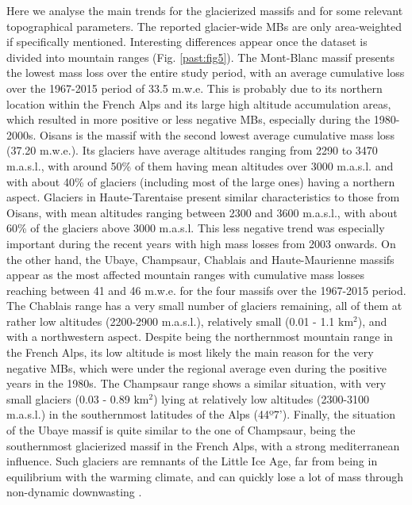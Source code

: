 Here we analyse the main trends for the glacierized massifs and for some relevant topographical parameters. The reported glacier-wide MBs are only area-weighted if specifically mentioned. Interesting differences appear once the dataset is divided into mountain ranges (Fig. \ref{past:fig5}). The Mont-Blanc massif presents the lowest mass loss over the entire study period, with an average cumulative loss over the 1967-2015 period of 33.5 m.w.e. This is probably due to its northern location within the French Alps and its large high altitude accumulation areas, which resulted in more positive or less negative MBs, especially during the 1980-2000s. Oisans is the massif with the second lowest average cumulative mass loss (37.20 m.w.e.). Its glaciers have average altitudes ranging from 2290 to 3470 m.a.s.l., with around 50\% of them having mean altitudes over 3000 m.a.s.l. and with about 40\% of glaciers (including most of the large ones) having a northern aspect. Glaciers in Haute-Tarentaise present similar characteristics to those from Oisans, with mean altitudes ranging between 2300 and 3600 m.a.s.l., with about 60\% of the glaciers above 3000 m.a.s.l. This less negative trend was especially important during the recent years with high mass losses from 2003 onwards. On the other hand, the Ubaye, Champsaur, Chablais and Haute-Maurienne massifs appear as the most affected mountain ranges with cumulative mass losses reaching between 41 and 46 m.w.e. for the four massifs over the 1967-2015 period. The Chablais range has a very small number of glaciers remaining, all of them at rather low altitudes (2200-2900 m.a.s.l.), relatively small (0.01 - 1.1 km$^{2}$), and with a northwestern aspect. Despite being the northernmost mountain range in the French Alps, its low altitude is most likely the main reason for the very negative MBs, which were under the regional average even during the positive years in the 1980s. The Champsaur range shows a similar situation, with very small glaciers (0.03 - 0.89 km$^{2}$) lying at relatively low altitudes (2300-3100 m.a.s.l.) in the southernmost latitudes of the Alps (44º7’). Finally, the situation of the Ubaye massif is quite similar to the one of Champsaur, being the southernmost glacierized massif in the French Alps, with a strong mediterranean influence. Such glaciers are remnants of the Little Ice Age, far from being in equilibrium with the warming climate, and can quickly lose a lot of mass through non-dynamic downwasting \citep{paul_rapid_2004}.

